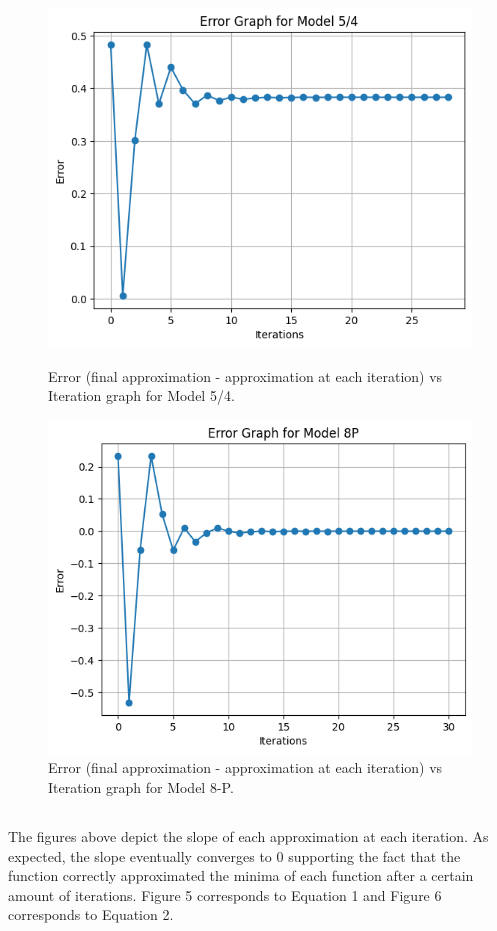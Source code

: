 \documentclass[linenumbers,RNAAS,trackchanges]{aastex631}
\begin{document}
\begin{figure}[H]
    \centering
    \includegraphics[scale=.75]{Error54.png}
    \caption{Error (final approximation - approximation at each iteration) vs Iteration graph for Model 5/4.}
    \label{fig:code}
    \centering
    \includegraphics[scale=.75]{Error8P.png}
    \caption{Error (final approximation - approximation at each iteration) vs Iteration graph for Model 8-P.}
    \label{fig:code}
\end{figure}
\subsection{}
The figures above depict the slope of each approximation at each iteration. As expected, the slope eventually converges to 0 supporting the fact that the function correctly approximated the minima of each function after a certain amount of iterations. Figure 5 corresponds to Equation 1 and Figure 6 corresponds to Equation 2. 
\end{document}
